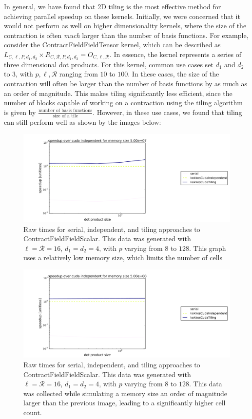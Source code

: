 In general, we have found that 2D tiling is the most effective method for
achieving parallel speedup on these kernels. Initially, we were concerned that
it would not perform as well on higher dimensionality kernels, where the size
of the contraction is often \textit{much} larger than the number of basis
functions. For example, consider the ContractFieldFieldTensor kernel, which can
be described as $L_{C,\ell,P,d_1,d_2} \times R_{C, \mathcal{R}, P,d_1,d_2} =
O_{C,\ell, \mathcal{R}}$. In essence, the kernel represents a series of three
dimensional dot products. For this kernel, common use cases set $d_1$ and $d_2$
to $3$, with $p, \ell, \mathcal{R}$ ranging from $10$ to $100$. In these cases,
the size of the contraction will often be larger than the number of basis
functions by as much as an order of magnitude. This makes tiling significantly
less efficient, since the number of blocks capable of working on a contraction
using the tiling algorithm is given by $\frac{\text{number of basis
functions}}{\text{size of a tile}}$. However, in these use cases, we found that
tiling can still perform well as shown by the images below: 

\begin{figure}[H]
    \centering
\includegraphics[scale = .2]{CFFTTiling1}
\caption{Raw times for serial, independent, and tiling approaches to ContractFieldFieldScalar. This data was generated with $\ell=\mathcal{R}=16$, $d_1=d_2=4$, with $p$ varying from $8$ to $128$. This graph uses a relatively low memory size, which limits the number of cells}
\end{figure}

\begin{figure}[H]
    \centering
\includegraphics[scale = .2]{CFFTTiling2}
\caption{Raw times for serial, independent, and tiling approaches to ContractFieldFieldScalar. This data was generated with $\ell=\mathcal{R}=16$, $d_1=d_2=4$, with $p$ varying from $8$ to $128$. This data was collected while simulating a memory size an order of magnitude larger than the previous image, leading to a significantly higher cell count. }
\end{figure}
 
